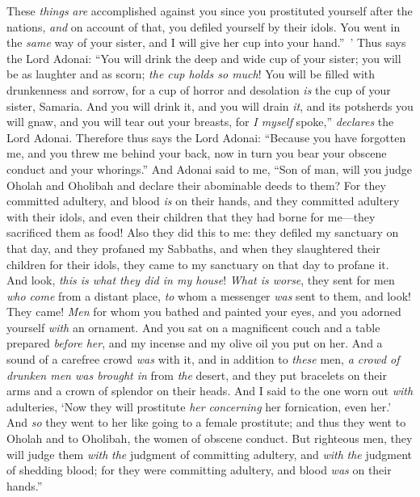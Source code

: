 \begin{biblechapter}
\verse These \textit{things} \textit{are} accomplished against you since you prostituted yourself after the nations, \textit{and} on account of that, you defiled yourself by their idols.
\verse You went in the \textit{same} way of your sister, and I will give her cup into your hand.” ’
\verse Thus says the Lord Adonai: “You will drink the deep and wide cup of your sister; you will be as laughter and as scorn; \textit{the cup holds so much}!
\verse You will be filled with drunkenness and sorrow, for a cup of horror and desolation \textit{is} the cup of your sister, Samaria.
\verse And you will drink it, and you will drain \textit{it}, and its potsherds you will gnaw, and you will tear out your breasts, for \textit{I myself} spoke,” \textit{declares} the Lord Adonai.
\verse Therefore thus says the Lord Adonai: “Because you have forgotten me, and you threw me behind your back, now in turn you bear your obscene conduct and your whorings.”
\verse And Adonai said to me, “Son of man, will you judge Oholah and Oholibah and declare their abominable deeds to them?
\verse For they committed adultery, and blood \textit{is} on their hands, and they committed adultery with their idols, and even their children that they had borne for me—they sacrificed them as food!
\verse Also they did this to me: they defiled my sanctuary on that day, and they profaned my Sabbaths,
\verse and when they slaughtered their children for their idols, they came to my sanctuary on that day to profane it. And look, \textit{this is what they did in my house}!
\verse \textit{What is worse}, they sent for men \textit{who come} from a distant place, \textit{to} whom a messenger \textit{was} sent to them, and look! They came! \textit{Men} for whom you bathed and painted your eyes, and you adorned yourself \textit{with} an ornament.
\verse And you sat on a magnificent couch and a table prepared \textit{before her}, and my incense and my olive oil you put on her.
\verse And a sound of a carefree crowd \textit{was} with it, and in addition to \textit{these} men, \textit{a crowd of drunken men was brought in} from \textit{the} desert, and they put bracelets on their arms and a crown of splendor on their heads.
\verse And I said to the one worn out \textit{with} adulteries, ‘Now they will prostitute \textit{her} \textit{concerning} her fornication, even her.’
\verse And \textit{so} they went to her like going to a female prostitute; and thus they went to Oholah and to Oholibah, the women of obscene conduct.
\verse But righteous men, they will judge them \textit{with} \textit{the} judgment of committing adultery, and \textit{with} \textit{the} judgment of shedding blood; for they were committing adultery, and blood \textit{was} on their hands.”

\end{biblechapter}

